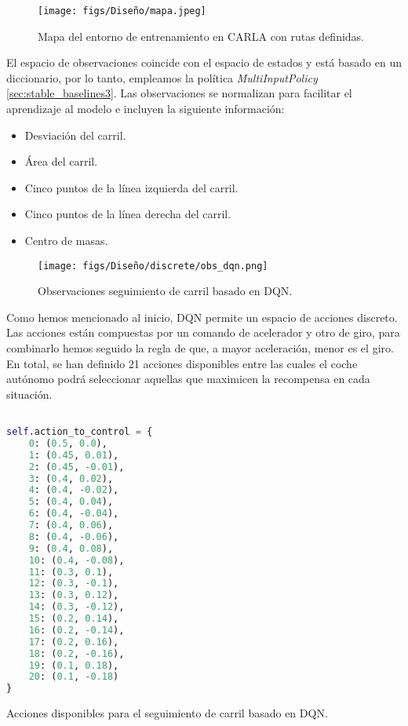 \begin{figure}[ht]
  \centering
  \texttt{[image: figs/Diseño/mapa.jpeg]}
  \caption{Mapa del entorno de entrenamiento en CARLA con rutas definidas.}
  \label{fig:mapa}
\end{figure}

\newpage

El espacio de observaciones coincide con el espacio de estados y está basado en un diccionario, por lo tanto, empleamos la política \textit{MultiInputPolicy} \ref{sec:stable_baselines3}. Las observaciones se normalizan para facilitar el aprendizaje al modelo e incluyen la siguiente información: 
\begin{itemize}
		\item Desviación del carril.
		\item Área del carril.
		\item Cinco puntos de la línea izquierda del carril.
		\item Cinco puntos de la línea derecha del carril.
		\item Centro de masas.
\end{itemize}

\begin{figure}[ht]
  \centering
  \texttt{[image: figs/Diseño/discrete/obs\_dqn.png]}
  \caption{Observaciones seguimiento de carril basado en \ac{DQN}.}
  \label{fig:dqn_obs}
\end{figure}

Como hemos mencionado al inicio, \ac{DQN} permite un espacio de acciones discreto. Las acciones están compuestas por un comando de acelerador y otro de giro, para combinarlo hemos seguido la regla de que, a mayor aceleración, menor es el giro. En total, se han definido 21 acciones disponibles entre las cuales el coche autónomo podrá seleccionar aquellas que maximicen la recompensa en cada situación.

\begin{code}[h]
\begin{lstlisting}[language=Python]

self.action_to_control = {
    0: (0.5, 0.0),
    1: (0.45, 0.01), 
    2: (0.45, -0.01),
    3: (0.4, 0.02),
    4: (0.4, -0.02),
    5: (0.4, 0.04),
    6: (0.4, -0.04),
    7: (0.4, 0.06),
    8: (0.4, -0.06),
    9: (0.4, 0.08),
    10: (0.4, -0.08),
    11: (0.3, 0.1),
    12: (0.3, -0.1),
    13: (0.3, 0.12),
    14: (0.3, -0.12),
    15: (0.2, 0.14),
    16: (0.2, -0.14),
    17: (0.2, 0.16),
    18: (0.2, -0.16),
    19: (0.1, 0.18),
    20: (0.1, -0.18)
}
\end{lstlisting}
\caption[Acciones disponibles para el seguimiento de carril basado en \ac{DQN}]{Acciones disponibles para el seguimiento de carril basado en \ac{DQN}.}
\label{cod:acc_dqn}
\end{code}

